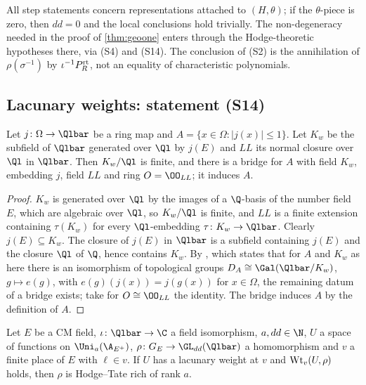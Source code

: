 \begin{remark}\label{rem:pf:steps2:scope}
All step statements concern representations attached to $(H,\theta)$; if the $\theta$-piece is zero,
then $dd=0$ and the local conclusions hold trivially. The non-degeneracy needed in the proof of
\cref{thm:geoone} enters through the Hodge-theoretic hypotheses there, via (S4) and (S14). The
conclusion of (S2) is the annihilation of $\rho(\sigma^{-1})$ by $\iota^{-1}P^{\mathrm{rt}}_R$, not an
equality of characteristic polynomials.
\end{remark}


\subsection{Lacunary weights: statement (S14)}\label{sec:pf:steps2:rich}

\begin{lemma}[Bridges]\label{lem:pf:steps2:bridge}
Let $j\colon\Omega\to\Qlbar$ be a ring map and $A=\{x\in\Omega:|j(x)|\le1\}$. Let $K_w$ be the subfield
of $\Qlbar$ generated over $\Ql$ by $j(E)$ and $LL$ its normal closure over $\Ql$ in $\Qlbar$. Then
$K_w/\Ql$ is finite, and there is a bridge for $A$ with field $K_w$, embedding $j$, field $LL$ and
ring $O=\OO_{LL}$; it induces $A$.
\end{lemma}

\begin{proof}
$K_w$ is generated over $\Ql$ by the images of a $\Q$-basis of the number field $E$, which are
algebraic over $\Ql$, so $K_w/\Ql$ is finite, and $LL$ is a finite extension containing $\tau(K_w)$
for every $\Ql$-embedding $\tau\colon K_w\to\Qlbar$. Clearly $j(E)\subseteq K_w$. The closure of $j(E)$
in $\Qlbar$ is a subfield containing $j(E)$ and the closure $\Ql$ of $\Q$, hence contains $K_w$. By
, which states that for $A$ and $K_w$ as here
there is an isomorphism of topological groups $D_A\cong\Gal(\Qlbar/K_w)$, $g\mapsto e(g)$, with
$e(g)(j(x))=j(g(x))$ for $x\in\Omega$, the remaining datum of a bridge exists; take for
$O\cong\OO_{LL}$ the identity. The bridge induces $A$ by the definition of $A$.
\end{proof}

\begin{theorem}[Richness]\label{thm:pf:steps2:richof}
Let $E$ be a CM field, $\iota\colon\Qlbar\to\C$ a field isomorphism, $a,dd\in\N$, $U$ a space of
functions on $\Uni_a(\A_{E^+})$, $\rho\colon G_E\to\GL_{dd}(\Qlbar)$ a homomorphism and $v$ a finite
place of $E$ with $\ell\in v$. If $U$ has a lacunary weight at $v$ and $\mathrm{Wt}_v(U,\rho)$ holds,
then $\rho$ is Hodge--Tate rich of rank $a$.
\end{theorem}

